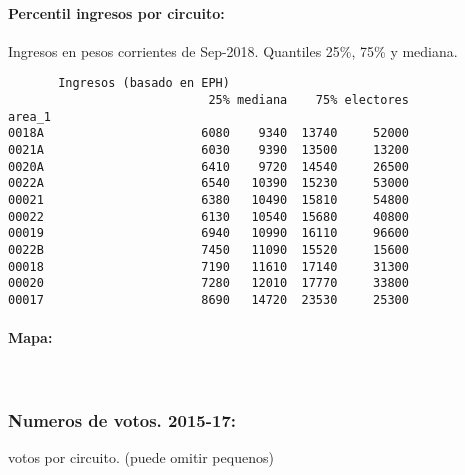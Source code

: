 \documentclass[11pt]{article}
\begin{document}
    \hypertarget{percentil-ingresos-por-circuito}{%
\paragraph{Percentil ingresos por
circuito:}\label{percentil-ingresos-por-circuito}}

    
    Ingresos en pesos corrientes de Sep-2018. Quantiles 25\%, 75\% y
mediana.

    
    
    \begin{verbatim}
       Ingresos (basado en EPH)                         
                            25% mediana    75% electores
area_1                                                  
0018A                      6080    9340  13740     52000
0021A                      6030    9390  13500     13200
0020A                      6410    9720  14540     26500
0022A                      6540   10390  15230     53000
00021                      6380   10490  15810     54800
00022                      6130   10540  15680     40800
00019                      6940   10990  16110     96600
0022B                      7450   11090  15520     15600
00018                      7190   11610  17140     31300
00020                      7280   12010  17770     33800
00017                      8690   14720  23530     25300
    \end{verbatim}

    
    \hypertarget{mapa}{%
\paragraph{Mapa:}\label{mapa}}

    
    \begin{center}
    \end{center}
    { \hspace*{\fill} \\}
    
    \hypertarget{numeros-de-votos.-2015-17}{%
\subsubsection{Numeros de votos.
2015-17:}\label{numeros-de-votos.-2015-17}}

    
    votos por circuito. (puede omitir pequenos)

    
    
\end{document}

